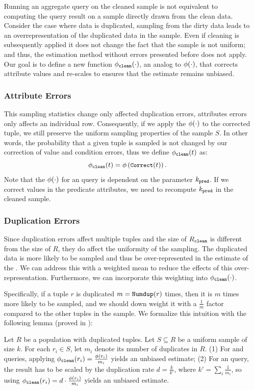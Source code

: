 Running an aggregate query on the cleaned sample is not equivalent to computing the query result on a sample directly drawn from the clean data.
Consider the case where data is duplicated, sampling from the dirty data leads to an overrepresentation of the duplicated data in the sample.
Even if cleaning is subsequently applied it does not change the fact that the sample is not uniform; and thus, the estimation method without errors presented before does not apply.
Our goal is to define a new function $\saqpplusfunc(\cdot)$, an analog to $\saqpfunc(\cdot)$, that corrects attribute values and re-scales to ensures that the estimate remains unbiased.

\subsubsection{Attribute Errors}
This sampling statistics change only affected duplication errors, attributes errors only affects an individual row.
Consequently, if we apply the $\saqpfunc(\cdot)$ to the corrected tuple, we still preserve the uniform sampling properties of the sample $S$.
In other words, the probability that a given tuple is sampled is not changed by our correction of value and condition errors, thus we define $\saqpplusfunc(t)$ as:
\[\small
\saqpplusfunc(t) = \saqpfunc \left( \Correct{t} \right).
\]
Note that the $\saqpfunc(\cdot)$ for an \avgfunc query is dependent on the parameter $k_{\pred}$. 
If we correct values in the predicate attributes, we need to recompute $k_{\pred}$ in the cleaned sample.

\subsubsection{Duplication Errors}
Since duplication errors affect multiple tuples and the size of $R_{\clean}$ is different from the size of $R$, they do affect the uniformity of the sampling.
The duplicated data is more likely to be sampled and thus be over-represented in the estimate of the \mean.
We can address this with a weighted mean to reduce the effects of this over-representation.
Furthermore, we can incorporate this weighting into $\saqpplusfunc(\cdot)$.

Specifically, if a tuple $r$ is duplicated $m=\Dedup{r}{R}$ times, then it is $m$ times more likely to be sampled, and we should down weight it with a $\frac{1}{m}$ factor compared to the other tuples in the sample.
We formalize this intuition with the following lemma (proved in \cite{wang1999sample}):
\begin{lemma}\label{lem:derror}
Let $R$ be a population with duplicated tuples. %
Let $S \subseteq R$ be a uniform sample of size $k$.
For each $r_{i}\in S$, let $m_i$ denote its number of duplicates in $R$.
 (1) For \sumfunc and \countfunc queries, applying $\saqpplusfunc(r_i)=\frac{\saqpfunc(r_i)}{m_i}$ yields an unbiased estimate;
(2) For an \avgfunc query, the result has to be scaled by the duplication rate $d=\frac{k}{k'}$,
where $k'=\sum_i\frac{1}{m_i}$, so using $\saqpplusfunc(r_i)=d\cdot\frac{\saqpfunc(r_i)}{m_i}$ yields an unbiased estimate.
\end{lemma}


